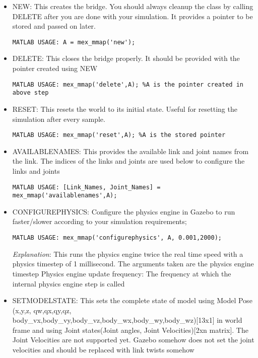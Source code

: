 \documentclass[letterpaper,10pt]{article}
\begin{document}
\begin{itemize}
\item NEW: This creates the bridge. You should always cleanup the
class by calling DELETE after you are done with your simulation. It
provides a pointer to be stored and passed on later.

\begin{Verbatim}[frame=single]
             MATLAB USAGE: A = mex_mmap('new');
\end{Verbatim}

\item
  DELETE: This closes the bridge properly. It should be provided with
  the pointer created using NEW

\begin{Verbatim}[frame=single]
        MATLAB USAGE: mex_mmap('delete',A); %A is the pointer created in above step
\end{Verbatim}
\item
  RESET: This resets the world to its initial state. Useful for
  resetting the simulation after every sample.

\begin{Verbatim}[frame=single]
        MATLAB USAGE: mex_mmap('reset',A); %A is the stored pointer
\end{Verbatim}
\item
  AVAILABLENAMES: This provides the available link and joint names from
  the link. The indices of the links and joints are used below to
  configure the links and joints

\begin{Verbatim}[frame=single]
        MATLAB USAGE: [Link_Names, Joint_Names] = mex_mmap('availablenames',A);
\end{Verbatim}
\item
  CONFIGUREPHYSICS: Configure the physics engine in Gazebo to run
  faster/slower according to your simulation requirements;

\begin{Verbatim}[frame=single]
        MATLAB USAGE: mex_mmap('configurephysics', A, 0.001,2000); 

\end{Verbatim}
        \textit{Explanation}: This runs the physics engine twice the real time speed with a physics timestep of 1 millisecond. The arguments taken are the physics engine timestep 
        Physics engine update frequency: The frequency at which the internal physics engine step is called
\item
  SETMODELSTATE: This sets the complete state of model using Model Pose
  (x,y,z, qw,qx,qy,qz,
  body\_vx,body\_vy,body\_vz,body\_wx,body\_wy,body\_wz){[}13x1{]} in
  world frame and using Joint states(Joint angles, Joint
  Velocities){[}2xn matrix{]}. %
  The Joint Velocities are not supported yet. Gazebo somehow does not set the joint velocities and
  should be replaced with link twists somehow


\end{itemize}
\end{document}
